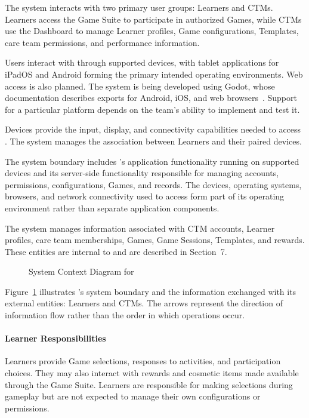 \documentclass[12pt]{article}
\begin{document}
The system interacts with two primary user groups: Learners and CTMs. Learners
access the Game Suite to participate in authorized Games, while CTMs use the
Dashboard to manage Learner profiles, Game configurations, Templates, care team
permissions, and performance information.

Users interact with \progname{} through supported devices, with tablet
applications for iPadOS and Android forming the primary intended operating
environments. Web access is also planned. The system is being developed using
Godot, whose documentation describes exports for Android, iOS, and web
browsers~\citep{godotExportDocumentation}. Support for a particular platform
depends on the team's ability to implement and test it.

Devices provide the input, display, and connectivity capabilities needed to
access \progname{}. The system manages the association between Learners and
their paired devices.

The system boundary includes \progname{}'s application functionality running on
supported devices and its server-side functionality responsible for managing
accounts, permissions, configurations, Games, and records. The devices,
operating systems, browsers, and network connectivity used to access \progname{}
form part of its operating environment rather than separate application
components.

The system manages information associated with CTM accounts, Learner profiles,
care team memberships, Games, Game Sessions, Templates, and rewards. These
entities are internal to \progname{} and are described in
Section~7.

\begin{figure}[htbp]
\centering
\resizebox{\textwidth}{!}{}
\caption{System Context Diagram for \progname{}}
\label{Fig_SystemContext}
\end{figure}

Figure~\ref{Fig_SystemContext} illustrates \progname{}'s system boundary and the
information exchanged with its external entities: Learners and CTMs. The arrows
represent the direction of information flow rather than the order in which
operations occur.

\paragraph{Learner Responsibilities}

Learners provide Game selections, responses to activities, and participation
choices. They may also interact with rewards and cosmetic items made available
through the Game Suite. Learners are responsible for making selections during
gameplay but are not expected to manage their own configurations or permissions.
\end{document}
